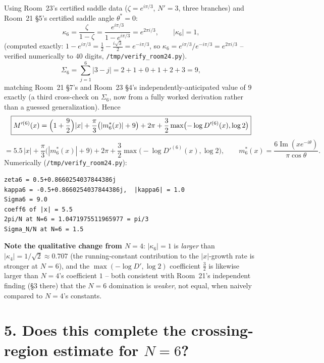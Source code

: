 \documentclass[11pt]{article}
\begin{document}
Using Room~23's certified saddle data ($\zeta=e^{i\pi/3}$, $N'=3$, three branches) and Room~21
\S5's certified saddle angle $\theta^\ast=0$:
\[
 \kappa_6=\frac{\zeta}{1-\zeta}=\frac{e^{i\pi/3}}{1-e^{i\pi/3}}=e^{2\pi i/3},\qquad|\kappa_6|=1,
\]
(computed exactly: $1-e^{i\pi/3}=\frac12-\frac{i\sqrt3}2=e^{-i\pi/3}$, so $\kappa_6=e^{i\pi/3}/
e^{-i\pi/3}=e^{2\pi i/3}$ -- verified numerically to $40$ digits, \texttt{/tmp/verify\_room24.py}).
\[
 \Sigma_6=\sum_{j=1}^6\bigl|3-j\bigr|=2+1+0+1+2+3=9,
\]
matching Room~21 \S7's and Room~23 \S4's independently-anticipated value of $9$ exactly (a third
cross-check on $\Sigma_6$, now from a fully worked derivation rather than a guessed generalization).
Hence
\[
 \boxed{M'^{(6)}(x)=\Bigl(1+\frac92\Bigr)|x|+\frac\pi3\bigl(|m^\ast_6(x)|+9\bigr)+2\pi
 +\frac32\max\bigl(-\log D'^{(6)}(x),\log2\bigr)}
\]
\[
 =5.5\,|x|+\frac\pi3\bigl(|m^\ast_6(x)|+9\bigr)+2\pi+\frac32\max\bigl(-\log D'^{(6)}(x),\log2\bigr),
 \qquad m^\ast_6(x)=\frac{6\operatorname{Im}(xe^{-i\theta})}{\pi\cos\theta}.
\]
Numerically (\texttt{/tmp/verify\_room24.py}):
\begin{verbatim}
zeta6 = 0.5+0.8660254037844386j
kappa6 = -0.5+0.8660254037844386j,  |kappa6| = 1.0
Sigma6 = 9.0
coeff6 of |x| = 5.5
2pi/N at N=6 = 1.0471975511965977 = pi/3
Sigma_N/N at N=6 = 1.5
\end{verbatim}
\textbf{Note the qualitative change from $N=4$}: $|\kappa_6|=1$ is \emph{larger} than
$|\kappa_4|=1/\sqrt2\approx0.707$ (the running-constant contribution to the $|x|$-growth rate is
stronger at $N=6$), and the $\max(-\log D',\log2)$ coefficient $\frac32$ is likewise larger than
$N=4$'s coefficient $1$ -- both consistent with Room~21's independent finding (\S3 there) that the
$N=6$ domination is \emph{weaker}, not equal, when naively compared to $N=4$'s constants.

\section*{5. Does this complete the crossing-region estimate for $N=6$?}
\end{document}
